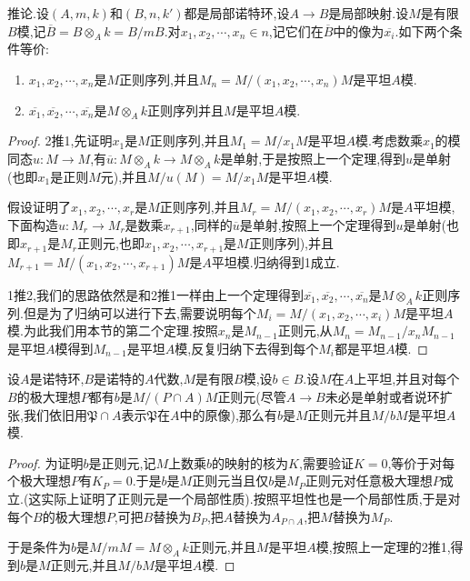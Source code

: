 推论.设$(A,m,k)$和$(B,n,k')$都是局部诺特环,设$A\to B$是局部映射.设$M$是有限$B$模,记$\overline{B}=B\otimes_Ak=B/mB$.对$x_1,x_2,\cdots,x_n\in n$,记它们在$\overline{B}$中的像为$\overline{x_i}$.如下两个条件等价:
\begin{enumerate}
	\item $x_1,x_2,\cdots,x_n$是$M$正则序列,并且$M_n=M/(x_1,x_2,\cdots,x_n)M$是平坦$A$模.
	\item $\overline{x_1},\overline{x_2},\cdots,\overline{x_n}$是$M\otimes_A k$正则序列并且$M$是平坦$A$模.
\end{enumerate}
\begin{proof}
	
	2推1,先证明$x_1$是$M$正则序列,并且$M_1=M/x_1M$是平坦$A$模.考虑数乘$x_1$的模同态$u:M\to M$,有$\overline{u}:M\otimes_A k\to M\otimes_A k$是单射,于是按照上一个定理,得到$u$是单射(也即$x_1$是正则$M$元),并且$M/u(M)=M/x_1M$是平坦$A$模.
	
	假设证明了$x_1,x_2,\cdots,x_r$是$M$正则序列,并且$M_r=M/(x_1,x_2,\cdots,x_r)M$是$A$平坦模,下面构造$u:M_r\to M_r$是数乘$x_{r+1}$,同样的$\overline{u}$是单射,按照上一个定理得到$u$是单射(也即$x_{r+1}$是$M_r$正则元,也即$x_1,x_2,\cdots,x_{r+1}$是$M$正则序列),并且$M_{r+1}=M/(x_1,x_2,\cdots,x_{r+1})M$是$A$平坦模.归纳得到1成立.
	
	1推2,我们的思路依然是和2推1一样由上一个定理得到$\overline{x_1},\overline{x_2},\cdots,\overline{x_n}$是$M\otimes_Ak$正则序列.但是为了归纳可以进行下去,需要说明每个$M_i=M/(x_1,x_2,\cdots,x_i)M$是平坦$A$模.为此我们用本节的第二个定理.按照$x_{n}$是$M_{n-1}$正则元,从$M_n=M_{n-1}/x_nM_{n-1}$是平坦$A$模得到$M_{n-1}$是平坦$A$模,反复归纳下去得到每个$M_i$都是平坦$A$模.
\end{proof}

设$A$是诺特环,$B$是诺特的$A$代数,$M$是有限$B$模,设$b\in B$.设$M$在$A$上平坦,并且对每个$B$的极大理想$P$都有$b$是$M/(P\cap A)M$正则元(尽管$A\to B$未必是单射或者说环扩张,我们依旧用$\mathfrak{P}\cap A$表示$\mathfrak{P}$在$A$中的原像),那么有$b$是$M$正则元并且$M/bM$是平坦$A$模.
\begin{proof}
	
	为证明$b$是正则元,记$M$上数乘$b$的映射的核为$K$,需要验证$K=0$,等价于对每个极大理想$P$有$K_P=0$.于是$b$是$M$正则元当且仅$b$是$M_P$正则元对任意极大理想$P$成立.(这实际上证明了正则元是一个局部性质).按照平坦性也是一个局部性质,于是对每个$B$的极大理想$P$,可把$B$替换为$B_P$,把$A$替换为$A_{P\cap A}$,把$M$替换为$M_P$.
	
	于是条件为$b$是$M/mM=M\otimes_Ak$正则元,并且$M$是平坦$A$模,按照上一定理的2推1,得到$b$是$M$正则元,并且$M/bM$是平坦$A$模.
\end{proof}

